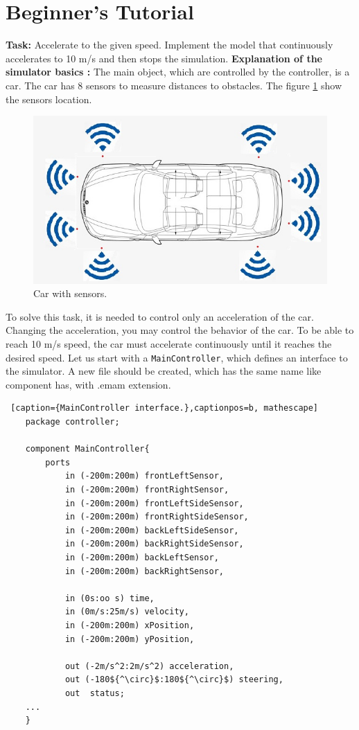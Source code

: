 \section{Beginner's Tutorial}
\textbf{Task:} Accelerate to the given speed.\newline
Implement the model that continuously accelerates to 10 m/s and then stops the simulation.\newline \newline
\textbf{Explanation of the simulator basics :}\newline
The main object, which are controlled by the controller, is a car. The car has 8 sensors to measure distances to obstacles. The figure \ref{fig:sensors} show the sensors location. \newline
\begin{figure}[h!]
    \centering
    \includegraphics[width=0.6\linewidth]{src/pic/car-with-sensors}
    \caption{Car with sensors.}
    \label{fig:sensors}
\end{figure} \newline
To solve this task, it is needed to control only an acceleration of the car. Changing the acceleration, you may control the behavior of the car. To be able to reach 10 m/s speed, the car must accelerate continuously until it reaches the desired speed. Let us start with a \texttt{MainController}, which defines an interface to the simulator. A new file should be created, which has the same name like component has, with .emam extension.
\bigskip
\begin{lstlisting} [caption={MainController interface.},captionpos=b, mathescape]
    package controller;

    component MainController{
        ports                                   
            in (-200m:200m) frontLeftSensor,
            in (-200m:200m) frontRightSensor,
            in (-200m:200m) frontLeftSideSensor,
            in (-200m:200m) frontRightSideSensor,
            in (-200m:200m) backLeftSideSensor,
            in (-200m:200m) backRightSideSensor,
            in (-200m:200m) backLeftSensor,
            in (-200m:200m) backRightSensor,

            in (0s:oo s) time,
            in (0m/s:25m/s) velocity,
            in (-200m:200m) xPosition,
            in (-200m:200m) yPosition,
    
            out (-2m/s^2:2m/s^2) acceleration,
            out (-180${^\circ}$:180${^\circ}$) steering,
            out  status;
    ...
    }
\end{lstlisting}
